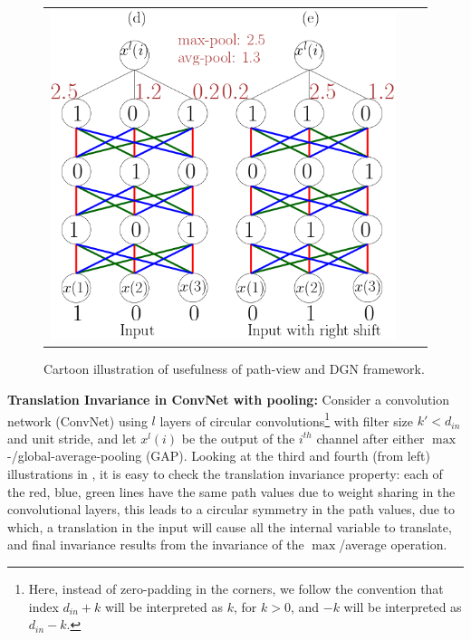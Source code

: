 \begin{figure}
{\begin{tabular}{ccc}
\includegraphics[scale=0.5]{figs/nnconv.png}
\end{tabular}
}
\caption{Cartoon illustration of usefulness of path-view and DGN framework.}
\label{fig:cartoon}
\end{figure}
\textbf{Translation Invariance in ConvNet with pooling:} Consider a convolution network (ConvNet) using $l$ layers of circular convolutions\footnote{Here, instead of zero-padding in the corners, we follow the convention that index $d_{in}+k$ will be interpreted as $k$, for $k>0$, and $-k$ will be interpreted as $d_{in}-k$.} with filter size $k'<d_{in}$ and unit stride, and let $x^l(i)$ be the output of the $i^{th}$ channel after either $\max$-/global-average-pooling (GAP). Looking at the third and fourth (from left) illustrations in , it is easy to check the translation invariance property: each of the red, blue, green lines have the same path values due to weight sharing in the convolutional layers, this leads to a circular symmetry in the path values, due to which, a translation in the input will cause all the internal variable to translate, and final invariance results from the invariance of the $\max$/average operation.

